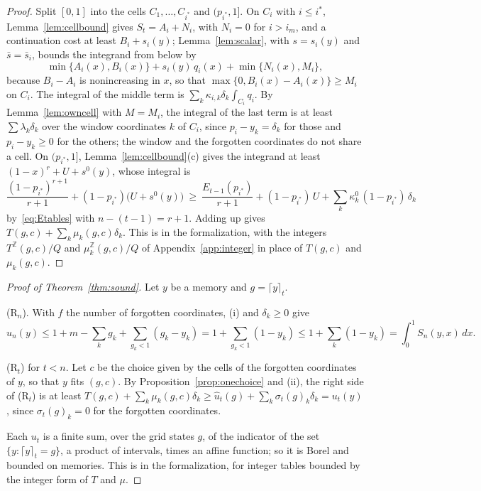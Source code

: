 \documentclass[11pt]{amsart}
\theoremstyle{definition}
\numberwithin{equation}{section}
\newcommand{\ceil}[2]{\lceil #1\rceil_{#2}}
\begin{document}
\begin{proof}
Split $[0,1]$ into the cells $C_1,\dots,C_{i^*}$ and $(p_{i^*},1]$. On $C_i$ with $i\le i^*$, Lemma~\ref{lem:cellbound} gives $S_t=A_i+N_i$, with $N_i=0$ for $i>i_m$, and a continuation cost at least $B_i+s_i(y)$; Lemma~\ref{lem:scalar}, with $s=s_i(y)$ and $\bar s=\bar s_i$, bounds the integrand from below by
\[
\min\{A_i(x),B_i(x)\}+s_i(y)\,q_i(x)+\min\{N_i(x),M_i\},
\]
because $B_i-A_i$ is nonincreasing in $x$, so that $\max\{0,B_i(x)-A_i(x)\}\ge M_i$ on $C_i$. The integral of the middle term is $\sum_k\kappa_{i,k}\delta_k\int_{C_i}q_i$. By Lemma~\ref{lem:owncell} with $M=M_i$, the integral of the last term is at least $\sum\lambda_k\delta_k$ over the window coordinates $k$ of $C_i$, since $p_i-y_k=\delta_k$ for those and $p_i-y_k\ge0$ for the others; the window and the forgotten coordinates do not share a cell. On $(p_{i^*},1]$, Lemma~\ref{lem:cellbound}(c) gives the integrand at least $(1-x)^r+U+s^0(y)$, whose integral is
\[
\frac{(1-p_{i^*})^{r+1}}{r+1}+(1-p_{i^*})\bigl(U+s^0(y)\bigr)\ \ge\ \frac{E_{t-1}(p_{i^*})}{r+1}+(1-p_{i^*})\,U+\sum_k\kappa^0_k\,(1-p_{i^*})\,\delta_k
\]
by~\eqref{eq:Etables} with $n-(t-1)=r+1$. Adding up gives $T(g,c)+\sum_k\mu_k(g,c)\delta_k$. This is  in the formalization, with the integers $T^{\mathbb Z}(g,c)/Q$ and $\mu^{\mathbb Z}_k(g,c)/Q$ of Appendix~\ref{app:integer} in place of $T(g,c)$ and $\mu_k(g,c)$.
\end{proof}

\begin{proof}[Proof of Theorem~\ref{thm:sound}]
Let $y$ be a memory and $g=\ceil{y}{t}$.

(R$_n$). With $f$ the number of forgotten coordinates, (i) and $\delta_k\ge0$ give
\[
u_n(y)\le1+m-\sum_kg_k+\sum_{g_k<1}(g_k-y_k)=1+\sum_{g_k<1}(1-y_k)\le1+\sum_k(1-y_k)=\int_0^1S_n(y,x)\,dx.
\]

(R$_t$) for $t<n$. Let $c$ be the choice given by the cells of the forgotten coordinates of $y$, so that $y$ fits $(g,c)$. By Proposition~\ref{prop:onechoice} and (ii), the right side of (R$_t$) is at least $T(g,c)+\sum_k\mu_k(g,c)\delta_k\ge\hat u_t(g)+\sum_k\sigma_t(g)_k\delta_k=u_t(y)$, since $\sigma_t(g)_k=0$ for the forgotten coordinates.

Each $u_t$ is a finite sum, over the grid states $g$, of the indicator of the set $\{y:\ceil{y}{t}=g\}$, a product of intervals, times an affine function; so it is Borel and bounded on memories. This is  in the formalization, for integer tables bounded by the integer form of $T$ and $\mu$.
\end{proof}
\end{document}
